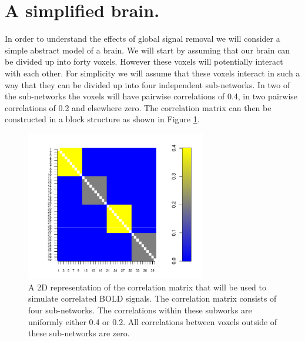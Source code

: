 \documentclass[a4paper]{article}\usepackage[]{graphicx}\usepackage[]{color}
\newenvironment{knitrout}{}{} %
\begin{document}
\section{A simplified brain.}

In order to understand the effects of global signal removal we will consider a simple abstract model of a brain.
We will start by assuming that our brain can be divided up into forty voxels. However these voxels will potentially interact with each other. For simplicity we will assume that these voxels interact in such a way that they can be divided up into four independent sub-networks. In two of the sub-networks the voxels will have pairwise correlations of 0.4, in two pairwise correlations of 0.2 and elsewhere zero. The correlation matrix can then be constructed in a block structure as shown in Figure \ref{fig:BlockMatrix}.

\begin{knitrout}
\color{fgcolor}\begin{figure}[]


{\centering \includegraphics[width=0.7\textwidth]{GSFigs/GSBlockMatrix} 

}

\caption[A 2D representation of the correlation matrix that will be used to simulate correlated BOLD signals]{A 2D representation of the correlation matrix that will be used to simulate correlated BOLD signals. The correlation matrix consists of four sub-networks. The correlations within these subworks are uniformly either 0.4 or 0.2. All correlations between voxels outside of these sub-networks are zero. \label{fig:BlockMatrix}}
\end{figure}


\end{knitrout}
\end{document}
